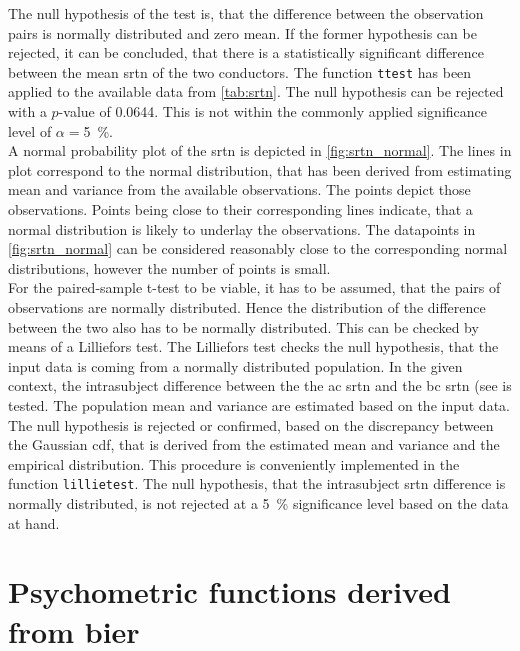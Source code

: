 The null hypothesis of the test is, that the difference between the observation pairs is normally distributed and zero mean. If the former hypothesis can be rejected, it can be concluded, that there is a statistically significant difference between the mean \gls{srtn} of the two conductors.
The \matlab function \texttt{ttest} has been applied to the available data from \autoref{tab:srtn}. The null hypothesis can be rejected with a $p$-value of 0.0644. This is not within the commonly applied significance level of $\alpha=$\SI{5}{\percent}.\\
A normal probability plot of the \gls{srtn} is depicted in \autoref{fig:srtn_normal}. The lines in plot correspond to the normal distribution, that has been derived from estimating mean and variance from the available observations. 
The points depict those observations. Points being close to their corresponding lines indicate, that a normal distribution is likely to underlay the observations. The datapoints in \autoref{fig:srtn_normal} can be considered reasonably close to the corresponding normal distributions, however the number of points is small.\\
For the paired-sample t-test to be viable, it has to be assumed, that the pairs of observations are normally distributed. Hence the distribution of the difference between the two also has to be normally distributed. 
This can be checked by means of a Lilliefors test.
The Lilliefors test checks the null hypothesis, that the input data is coming from a normally distributed population. 
In the given context, the intrasubject difference between the the \gls{ac} \gls{srtn} and the \gls{bc} \gls{srtn} (see  is tested.
The population mean and variance are estimated based on the input data. The null hypothesis is rejected or confirmed, based on the discrepancy between the Gaussian \gls{cdf}, that is derived from the estimated mean and variance and the empirical distribution.
This procedure is conveniently implemented in the \matlab function \texttt{lillietest}.
The null hypothesis, that the intrasubject \gls{srtn} difference is normally distributed, is not rejected at a \SI{5}{\percent} significance level based on the data at hand.\\

\section{Psychometric functions derived from \gls{bier}}\label{sec:result_psycho}

